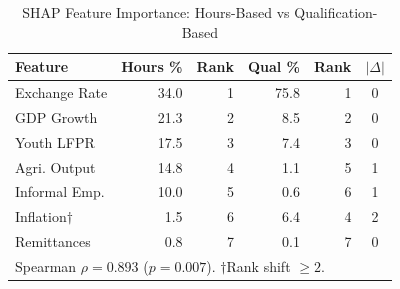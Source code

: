 \begin{table}[ht]
\caption{SHAP Feature Importance: Hours-Based vs Qualification-Based}
\label{tab:shap_sensitivity}
\setlength{\tabcolsep}{3pt}
\footnotesize
\begin{tabular}{lrrrrc}
\toprule
\textbf{Feature} & \textbf{Hours \%} & \textbf{Rank} & \textbf{Qual \%} & \textbf{Rank} & \textbf{$|\Delta|$}\\
\midrule
Exchange Rate & 34.0 & 1 & 75.8 & 1 & 0\\
GDP Growth & 21.3 & 2 & 8.5 & 2 & 0\\
Youth LFPR & 17.5 & 3 & 7.4 & 3 & 0\\
Agri. Output & 14.8 & 4 & 1.1 & 5 & 1\\
Informal Emp. & 10.0 & 5 & 0.6 & 6 & 1\\
Inflation$\dagger$ & 1.5 & 6 & 6.4 & 4 & 2\\
Remittances & 0.8 & 7 & 0.1 & 7 & 0\\
\midrule
\multicolumn{6}{l}{\scriptsize Spearman $\rho = 0.893$ ($p = 0.007$). $\dagger$Rank shift $\geq 2$.}\\
\bottomrule
\end{tabular}
\end{table}
